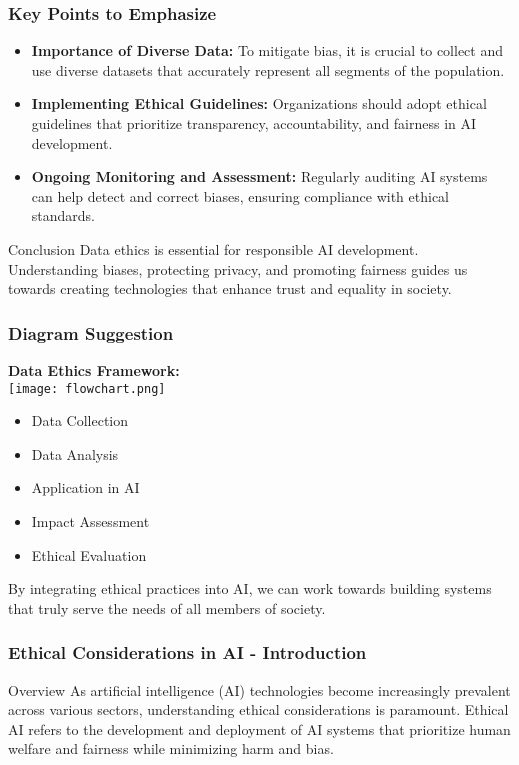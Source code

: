 \documentclass[aspectratio=169]{beamer}
\begin{document}
\begin{frame}[fragile]
    \frametitle{Key Points to Emphasize}
    \begin{itemize}
        \item \textbf{Importance of Diverse Data:} To mitigate bias, it is crucial to collect and use diverse datasets that accurately represent all segments of the population.
        \item \textbf{Implementing Ethical Guidelines:} Organizations should adopt ethical guidelines that prioritize transparency, accountability, and fairness in AI development.
        \item \textbf{Ongoing Monitoring and Assessment:} Regularly auditing AI systems can help detect and correct biases, ensuring compliance with ethical standards.
    \end{itemize}
    
    \begin{block}{Conclusion}
        Data ethics is essential for responsible AI development. Understanding biases, protecting privacy, and promoting fairness guides us towards creating technologies that enhance trust and equality in society.
    \end{block}
\end{frame}

\begin{frame}[fragile]
    \frametitle{Diagram Suggestion}
    \begin{center}
        \textbf{Data Ethics Framework:}\\
        \texttt{[image: flowchart.png]} %
    \end{center}
    \begin{itemize}
        \item Data Collection 
        \item Data Analysis 
        \item Application in AI 
        \item Impact Assessment 
        \item Ethical Evaluation
    \end{itemize}
    By integrating ethical practices into AI, we can work towards building systems that truly serve the needs of all members of society.
\end{frame}

\begin{frame}[fragile]
    \frametitle{Ethical Considerations in AI - Introduction}
    \begin{block}{Overview}
        As artificial intelligence (AI) technologies become increasingly prevalent across various sectors, understanding ethical considerations is paramount. 
        Ethical AI refers to the development and deployment of AI systems that prioritize human welfare and fairness while minimizing harm and bias.
    \end{block}
\end{frame}
\end{document}
